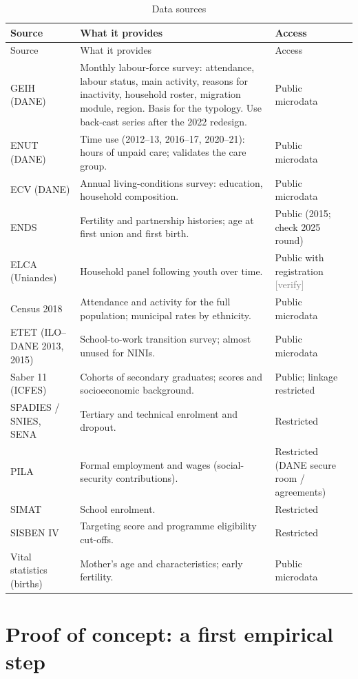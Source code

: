 \documentclass[11pt]{article}
\newcommand{\verify}{\textcolor{gray}{\textsf{\footnotesize[verify]}}}
\begin{document}
\begingroup\small
\begin{longtable}{P{3.2cm}P{7.2cm}P{3.6cm}}
\caption{Data sources}\label{tab:data}\\
\toprule
Source & What it provides & Access \\
\midrule
\endfirsthead
\toprule
Source & What it provides & Access \\
\midrule
\endhead
\bottomrule
\endfoot
GEIH (DANE) & Monthly labour-force survey: attendance, labour status, main activity, reasons for inactivity, household roster, migration module, region. Basis for the typology. Use back-cast series after the 2022 redesign. & Public microdata \\
ENUT (DANE) & Time use (2012--13, 2016--17, 2020--21): hours of unpaid care; validates the care group. & Public microdata \\
ECV (DANE) & Annual living-conditions survey: education, household composition. & Public microdata \\
ENDS & Fertility and partnership histories; age at first union and first birth. & Public (2015; check 2025 round) \\
ELCA (Uniandes) & Household panel following youth over time. & Public with registration \verify \\
Census 2018 & Attendance and activity for the full population; municipal rates by ethnicity. & Public microdata \\
ETET (ILO--DANE 2013, 2015) & School-to-work transition survey; almost unused for NINIs. & Public microdata \\
Saber 11 (ICFES) & Cohorts of secondary graduates; scores and socioeconomic background. & Public; linkage restricted \\
SPADIES / SNIES, SENA & Tertiary and technical enrolment and dropout. & Restricted \\
PILA & Formal employment and wages (social-security contributions). & Restricted (DANE secure room / agreements) \\
SIMAT & School enrolment. & Restricted \\
SISBEN IV & Targeting score and programme eligibility cut-offs. & Restricted \\
Vital statistics (births) & Mother's age and characteristics; early fertility. & Public microdata \\
\end{longtable}
\endgroup

\section{Proof of concept: a first empirical step}\label{sec:plan}
\end{document}
